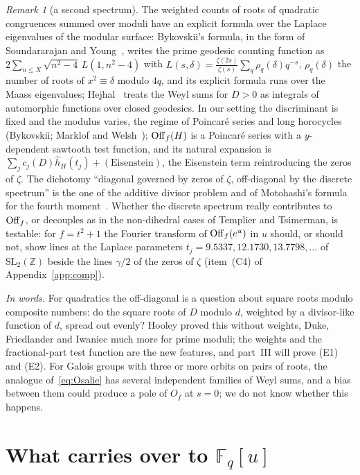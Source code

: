 \documentclass[11pt,a4paper]{article}
\theoremstyle{remark}\newtheorem{remark}[theorem]{Remark}
\newcommand{\Z}{\mathbb{Z}}\newcommand{\Q}{\mathbb{Q}}\newcommand{\F}{\mathbb{F}}\newcommand{\C}{\mathbb{C}}
\begin{document}
\begin{remark}[a second spectrum]
The weighted counts of roots of quadratic congruences summed over moduli have an explicit formula over the
Laplace eigenvalues of the modular surface: Bykovskii's formula, in the form of Soundararajan and
Young~\cite[Prop.~2.2]{SoundararajanYoung2013}, writes the prime geodesic counting function as
$2\sum_{n\le X}\sqrt{n^2-4}\,L(1,n^2-4)$ with $L(s,\delta)=\frac{\zeta(2s)}{\zeta(s)}\sum_q\rho_q(\delta)q^{-s}$,
$\rho_q(\delta)$ the number of roots of $x^2\equiv\delta$ modulo $4q$, and its explicit formula runs over the
Maass eigenvalues; Hejhal~\cite{Hejhal1986} treats the Weyl sums for $D>0$ as integrals of automorphic
functions over closed geodesics. In our setting the discriminant is fixed and the modulus varies, the regime
of Poincar\'e series and long horocycles (Bykovskii; Marklof and Welsh~\cite{MarklofWelsh2023}); $\mathrm{Off}_f(H)$ is a
Poincar\'e series with a $y$-dependent sawtooth test function, and its natural expansion is
$\sum_jc_j(D)\hat h_H(t_j)+(\text{Eisenstein})$, the Eisenstein term reintroducing the zeros of $\zeta$. The
dichotomy ``diagonal governed by zeros of $\zeta$, off-diagonal by the discrete spectrum'' is the one of the
additive divisor problem and of Motohashi's formula for the fourth moment~\cite{Motohashi1993}. Whether the
discrete spectrum really contributes to $\mathrm{Off}_f$, or decouples as in the non-dihedral cases of Templier and
Tsimerman, is testable: for $f=t^2+1$ the Fourier transform of $\mathrm{Off}_f(e^u)$ in $u$ should, or should not, show
lines at the Laplace parameters $t_j=9.5337, 12.1730, 13.7798,\dots$ of $\mathrm{SL}_2(\Z)$ beside the lines
$\gamma/2$ of the zeros of $\zeta$ (item~(C4) of Appendix~\ref{app:comp}).
\end{remark}

\emph{In words.} For quadratics the off-diagonal is a question about square roots modulo composite numbers:
do the square roots of $D$ modulo $d$, weighted by a divisor-like function of $d$, spread out evenly? Hooley
proved this without weights, Duke, Friedlander and Iwaniec much more for prime moduli; the weights and the
fractional-part test function are the new features, and part~III will prove (E1) and (E2). For Galois
groups with three or more orbits on pairs of roots, the analogue of~\eqref{eq:Osalie} has several independent
families of Weyl sums, and a bias between them could produce a pole of $O_f$ at $s=0$; we do not know
whether this happens.

\section{What carries over to $\F_q[u]$}\label{sec:ff}
\end{document}
